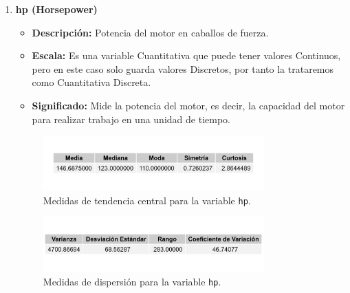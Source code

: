 \documentclass{article}
\begin{document}
\begin{enumerate}
	\item \textbf{hp (Horsepower)}

	      \begin{itemize}
		      \item \textbf{Descripción:} Potencia del motor en caballos de fuerza.
		      \item \textbf{Escala:} Es una variable Cuantitativa que puede tener valores Continuos, pero en este caso solo guarda valores Discretos, por tanto la trataremos como Cuantitativa Discreta.
		      \item \textbf{Significado:} Mide la potencia del motor, es decir, la capacidad del motor para realizar trabajo en una unidad de tiempo.
	      \end{itemize}

	      \begin{figure}[H]
		      \centering
		      \includegraphics[width=0.8\textwidth]{MTC/hp_central.png}
		      \caption{Medidas de tendencia central para la variable \texttt{hp}.}
		      \label{fig:hp_central}
	      \end{figure}

	      \begin{figure}[H]
		      \centering
		      \includegraphics[width=0.8\textwidth]{MTC/hp_dispersion.png}
		      \caption{Medidas de dispersión para la variable \texttt{hp}.}
		      \label{fig:hp_dispersion}
	      \end{figure}


\end{enumerate}
\end{document}

